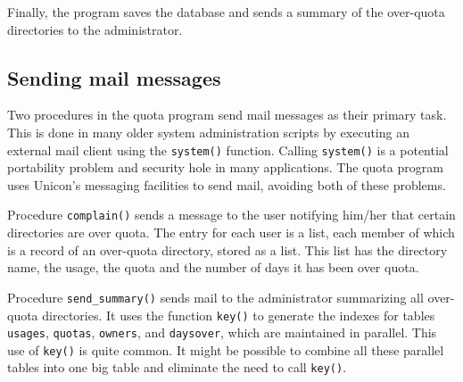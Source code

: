 Finally, the program saves the database and sends a summary of the
over-quota directories to the administrator. 


\subsection{Sending mail messages}

Two procedures in the quota program send mail messages as their primary
task. This is done in many older system administration scripts by
executing an external mail client using the \texttt{system()} function.
Calling \texttt{system()} is a potential portability
problem and security hole in many applications. The quota program uses
Unicon's messaging facilities to send mail, avoiding
both of these problems.

Procedure \texttt{complain()} sends a message to the user notifying
him/her that certain directories are over quota. The entry for each
user is a list, each member of which is a record of an over-quota
directory, stored as a list. This list has the directory name, the
usage, the quota and the number of days it has been over quota.


Procedure \texttt{send\_summary()} sends mail to the administrator
summarizing all over-quota directories. It uses the function
\texttt{key()} to generate the indexes for tables
\texttt{usages}, \texttt{quotas}, \texttt{owners}, and
\texttt{daysover}, which are maintained in parallel. This use of
\texttt{key()} is quite common. It might be possible to combine all
these parallel tables into one big table and eliminate the need to call
\texttt{key()}.

